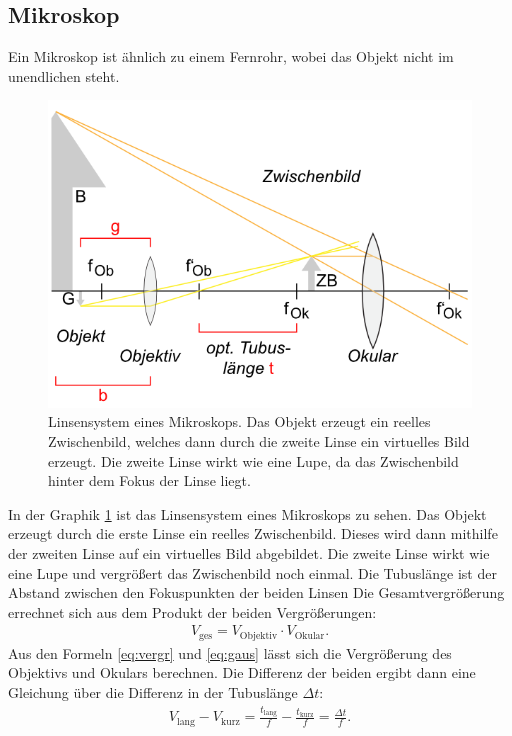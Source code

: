 \documentclass[12pt,a4paper,titlepage,headinclude]{scrartcl}
\numberwithin{equation}{subsection}
\begin{document}
\subsection{Mikroskop}
Ein Mikroskop ist ähnlich zu einem Fernrohr, wobei das Objekt nicht im unendlichen steht.
\begin{figure}[!h]
\centering
\includegraphics{mikroskop.png}
\caption{Linsensystem eines Mikroskops. Das Objekt erzeugt ein reelles Zwischenbild, welches dann durch die zweite Linse ein virtuelles Bild erzeugt. Die zweite Linse wirkt wie eine Lupe, da das Zwischenbild hinter dem Fokus der Linse liegt. \cite[Abgerufen am: 04.03.2015]{LP17}}
\label{fig:linsenmikroskop}
\end{figure}
In der Graphik \ref{fig:linsenmikroskop} ist das Linsensystem eines Mikroskops zu sehen.
Das Objekt erzeugt durch die erste Linse ein reelles Zwischenbild.
Dieses wird dann mithilfe der zweiten Linse auf ein virtuelles Bild abgebildet.
Die zweite Linse wirkt wie eine Lupe und vergrößert das Zwischenbild noch einmal.
Die Tubuslänge ist der Abstand zwischen den Fokuspunkten der beiden Linsen
Die Gesamtvergrößerung errechnet sich aus dem Produkt der beiden Vergrößerungen:
\begin{align}
	V_\text{ges}=V_\text{Objektiv}\cdot V_\text{Okular}.
\end{align}
Aus den Formeln \eqref{eq:vergr} und \eqref{eq:gaus} lässt sich die Vergrößerung des Objektivs und Okulars berechnen.
Die Differenz der beiden ergibt dann eine Gleichung über die Differenz in der Tubuslänge $\Delta t$:
\begin{align}
	V_\text{lang}-V_\text{kurz}=\frac{t_\text{lang}}{f}-\frac{t_\text{kurz}}{f}=\frac{\Delta t}{f}.\label{eq:f}
\end{align}
\end{document}
